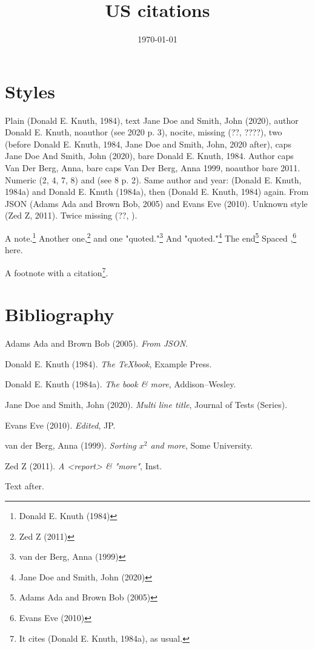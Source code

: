 \documentclass[11pt]{article}
\date{\today}
\title{US citations}
\begin{document}
\maketitle
\tableofcontents

\section{Styles}
\label{sec:org0e4d337}
Plain (Donald E. Knuth, 1984), text Jane Doe and Smith, John (2020), author Donald E. Knuth,
noauthor (see 2020 p. 3), nocite, missing (??, ????),
two (before Donald E. Knuth, 1984,  Jane Doe and Smith, John, 2020 after), caps Jane Doe And Smith, John (2020), bare Donald E. Knuth, 1984.
Author caps Van Der Berg, Anna, bare caps Van Der Berg, Anna 1999, noauthor bare 2011.
Numeric (2, 4, 7, 8) and (see 8 p. 2).
Same author and year: (Donald E. Knuth, 1984a) and Donald E. Knuth (1984a), then (Donald E. Knuth, 1984) again.
From JSON (Adams Ada and Brown Bob, 2005) and Evans Eve (2010).
Unknown style (Zed Z, 2011).  Twice missing (??, ).

A note.\footnote{Donald E. Knuth (1984)} Another one,\footnote{Zed Z (2011)} and one "quoted."\footnote{van der Berg, Anna (1999)}
And "quoted."\footnote{Jane Doe and Smith, John (2020)} The end\footnote{Adams Ada and Brown Bob (2005)}
Spaced ,\footnote{Evans Eve (2010)}  here.

A footnote with a citation\footnote{It cites (Donald E. Knuth, 1984a), as usual.}.
\section{Bibliography}
\label{sec:org3028fdc}
\noindent
Adams Ada and Brown Bob (2005). \emph{From JSON}.

\noindent
Donald E. Knuth (1984). \emph{The {\TeX}book}, Example Press.

\noindent
Donald E. Knuth (1984a). \emph{The \METAFONT book \& more}, Addison--Wesley.

\noindent
Jane Doe and Smith, John (2020). \emph{Multi line title}, Journal of Tests (Series).

\noindent
Evans Eve (2010). \emph{Edited}, JP.

\noindent
van der Berg, Anna (1999). \emph{Sorting $x^2$ and \alpha{} more}, Some University.

\noindent
Zed Z (2011). \emph{A <report> & "more"}, Inst.

Text after.
\end{document}
